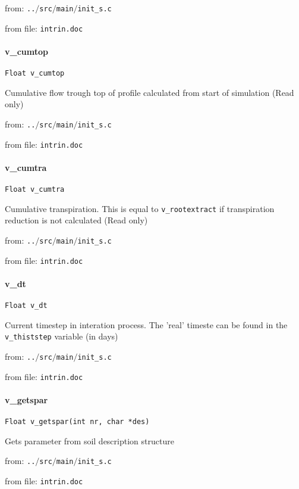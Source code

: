 from: {\tt ..$/$src$/$main$/$init\_s.c}

from file: {\tt intrin.doc}


\paragraph{v\_cumtop}
\begin{verbatim}
Float v_cumtop
\end{verbatim}
Cumulative flow trough top of profile calculated from start of
simulation (Read only)


from: {\tt ..$/$src$/$main$/$init\_s.c}

from file: {\tt intrin.doc}


\paragraph{v\_cumtra}
\begin{verbatim}
Float v_cumtra
\end{verbatim}
Cumulative transpiration. This is equal to {\tt v\_rootextract} if
transpiration reduction is not calculated (Read only) 


from: {\tt ..$/$src$/$main$/$init\_s.c}

from file: {\tt intrin.doc}


\paragraph{v\_dt}
\begin{verbatim}
Float v_dt
\end{verbatim}
Current timestep in interation process. The 'real' timeste can
be found in the {\tt v\_thiststep} variable (in days) 


from: {\tt ..$/$src$/$main$/$init\_s.c}

from file: {\tt intrin.doc}


\paragraph{v\_getspar}
\begin{verbatim}
Float v_getspar(int nr, char *des)
\end{verbatim}
Gets parameter from soil description structure


from: {\tt ..$/$src$/$main$/$init\_s.c}

from file: {\tt intrin.doc}



